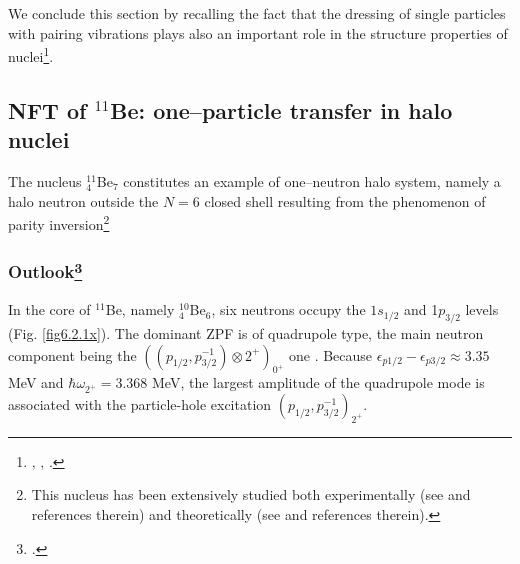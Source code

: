   
  We conclude this section by recalling the fact that the dressing of single particles with pairing vibrations plays also an important role in the structure properties of nuclei\footnote{\cite{Barranco:87b}, \cite{Bes:88}, \cite{Baroni:04}.}.
  
  \subsection{NFT of $^{11}$Be: one--particle transfer in halo nuclei}\label{C6S2}
  The nucleus $^{11}_4$Be$_7$ constitutes an example of one--neutron halo system, namely a halo neutron outside the $N=6$ closed shell resulting from the phenomenon of parity inversion\footnote{\label{f21C5}This nucleus has been extensively studied both experimentally (see \cite{Iwasaki:00,Fortier:99,Winfield:01,Auton:70,Zwieglinski:79,Schmitt:13,Nortershauser:09,Kwan:14}  and references therein) and theoretically (see \cite{Talmi:60,Otsuka:93,Sagawa:93,Vinh:95,Gori:04,Nunes:96,Fossez:16,Hamamoto:07,Kanada:02,Calci:16,Krieger:12,Timofeyuk:99,Keeley:04,Deltuva:09,Deltuva:13,Lay:14,deDiego:14} and references therein).}
  
  \subsubsection[Outlook]{Outlook\footnote{\cite{Barranco:17}.}}
  In the core of $^{11}$Be, namely $^{10}_{4}$Be$_{6}$, six neutrons occupy the $1s_{1/2}$ and 1$p_{3/2}$ levels (Fig. \ref{fig6.2.1x}). The 
  dominant ZPF is of quadrupole type, the main neutron  component being  the 
  $((p_{1/2},p^{-1}_{3/2})\otimes 2^+)_{0^+}$ one . Because $\epsilon_{p1/2} -
  \epsilon_{p3/2}\approx 3.35 $ MeV and $\hbar \omega_{2^+} =$3.368 MeV, the largest 
  amplitude of the quadrupole mode is associated with the particle-hole excitation $(p_{1/2},p^{-1}_{3/2})_{2^+}$.
  
